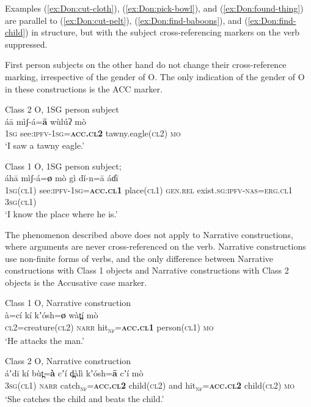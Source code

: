 \documentclass[output=collectionpaper,hidelinks]{langscibook}
\theoremstyle{remark}
\begin{document}
Examples (\ref{ex:Don:cut-cloth}), (\ref{ex:Don:pick-bowl}), and
(\ref{ex:Don:found-thing}) are parallel to (\ref{ex:Don:cut-pelt}),
(\ref{ex:Don:find-baboons}), and (\ref{ex:Don:find-child}) in structure, but
with the subject cross-referencing markers on the verb suppressed.

First person subjects on the other hand do not change their cross-reference
marking, irrespective of the gender of O.  The only indication of the gender of
O in these constructions is the ACC marker.

\ea
 Class 2 O, 1SG person subject \\
\gll áā mìʃ-á=\textbf{ā} wùlúʔ mò \\
 \textsc{1sg} see:\textsc{ipfv}-\textsc{1sg}=\textbf{\textsc{acc.cl2}} tawny.eagle(\textsc{cl2}) \textsc{mo} \\
\glt `I saw a tawny eagle.' \\
\z

\ea
\label{ex:Don:know-place}
Class 1 O, 1SG person subject; \cite{d:BeamCridland:Uduk} \\
\gll áhā mìʃ-á=\textbf{ø} mò gì dǐ-n=ā áɗī \\
 \textsc{1sg}(\textsc{cl1}) see:\textsc{ipfv}-\textsc{1sg}=\textbf{\textsc{acc.cl1}} place(\textsc{cl1}) \textsc{gen.rel} exist.\textsc{sg}:\textsc{ipfv}-\textsc{nas}=\textsc{erg.cl1} \textsc{3sg}(\textsc{cl1}) \\
\glt `I know the place where he is.'  \\
\z


The phenomenon described above does not apply to Narrative constructions, where
arguments are never cross-referenced on the verb.  Narrative constructions use
non-finite forms of verbs, and the only difference between Narrative
constructions with Class 1 objects and Narrative constructions with Class 2
objects is the Accusative case marker.


\ea
 Class 1 O, Narrative construction \\
\gll à=cí kí kʼósh=\textbf{ø} wàt̪í mò \\
 \textsc{cl2}=creature(\textsc{cl2}) \textsc{narr} hit\textsubscript{\textsc{nf}}=\textbf{\textsc{acc.cl1}} person(\textsc{cl1}) \textsc{mo} \\
\glt `He attacks the man.' \\
\z


\ea
 Class 2 O, Narrative construction \\
\gll áʼdī kí bùt̪=\textbf{à} cʼí d̪àlì kʼósh=\textbf{ā} cʼí mò \\
 \textsc{3sg}(\textsc{cl1}) \textsc{narr} catch\textsubscript{\textsc{nf}}=\textbf{\textsc{acc.cl2}} child(\textsc{cl2}) and hit\textsubscript{\textsc{nf}}=\textbf{\textsc{acc.cl2}} child(\textsc{cl2}) \textsc{mo} \\
\glt `She catches the child and beats the child.' \\
\z
\end{document}
